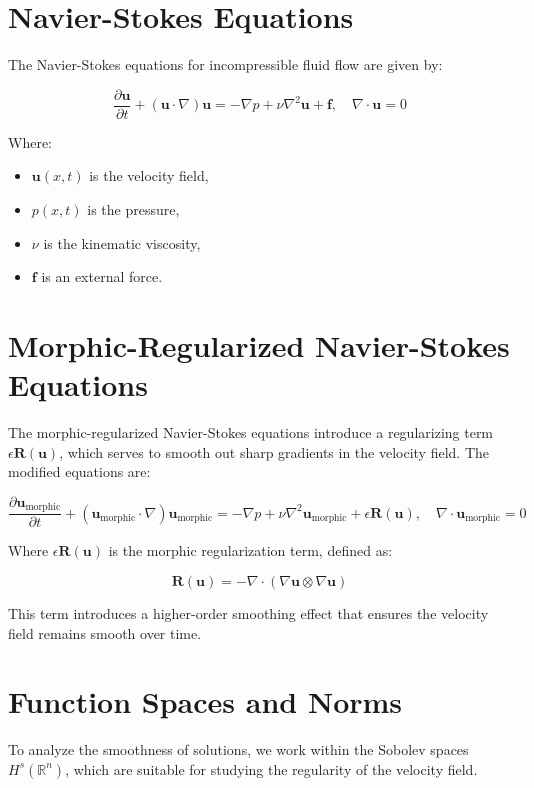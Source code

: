 \documentclass{article}
\begin{document}
\section{Navier-Stokes Equations}

The Navier-Stokes equations for incompressible fluid flow are given by:

\[
\frac{\partial \mathbf{u}}{\partial t} + (\mathbf{u} \cdot \nabla) \mathbf{u} = -\nabla p + \nu \nabla^2 \mathbf{u} + \mathbf{f}, \quad \nabla \cdot \mathbf{u} = 0
\]

Where:
\begin{itemize}
    \item \( \mathbf{u}(x, t) \) is the velocity field,
    \item \( p(x, t) \) is the pressure,
    \item \( \nu \) is the kinematic viscosity,
    \item \( \mathbf{f} \) is an external force.
\end{itemize}

\section{Morphic-Regularized Navier-Stokes Equations}

The morphic-regularized Navier-Stokes equations introduce a regularizing term \( \epsilon \mathbf{R}(\mathbf{u}) \), which serves to smooth out sharp gradients in the velocity field. The modified equations are:

\[
\frac{\partial \mathbf{u}_{\text{morphic}}}{\partial t} + (\mathbf{u}_{\text{morphic}} \cdot \nabla) \mathbf{u}_{\text{morphic}} = -\nabla p + \nu \nabla^2 \mathbf{u}_{\text{morphic}} + \epsilon \mathbf{R}(\mathbf{u}), \quad \nabla \cdot \mathbf{u}_{\text{morphic}} = 0
\]

Where \( \epsilon \mathbf{R}(\mathbf{u}) \) is the morphic regularization term, defined as:

\[
\mathbf{R}(\mathbf{u}) = -\nabla \cdot (\nabla \mathbf{u} \otimes \nabla \mathbf{u})
\]

This term introduces a higher-order smoothing effect that ensures the velocity field remains smooth over time.

\section{Function Spaces and Norms}

To analyze the smoothness of solutions, we work within the Sobolev spaces \( H^s(\mathbb{R}^n) \), which are suitable for studying the regularity of the velocity field.
\end{document}
